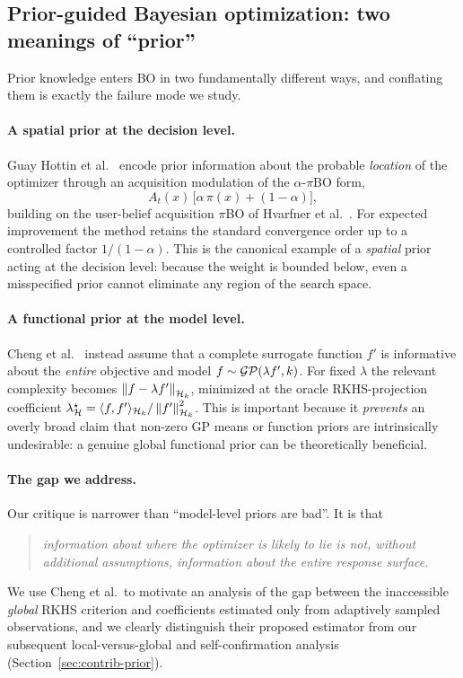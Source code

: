 \subsection{Prior-guided Bayesian optimization: two meanings of ``prior''}
\label{sec:bg-prior}

Prior knowledge enters BO in two fundamentally different ways, and conflating
them is exactly the failure mode we study.

\paragraph{A spatial prior at the decision level.}
Guay Hottin et al.~\cite{guayhottin2025} encode prior information about the
probable \emph{location} of the optimizer through an acquisition modulation of
the $\alpha$-$\pi$BO form,
\[
A_t(x)\,\bigl[\alpha\,\pi(x)+(1-\alpha)\bigr],
\]
building on the user-belief acquisition $\pi$BO of Hvarfner et
al.~\cite{hvarfner2022}. For expected improvement the method retains the standard
convergence order up to a controlled factor $1/(1-\alpha)$. This is the canonical
example of a \emph{spatial} prior acting at the decision level: because the
weight is bounded below, even a misspecified prior cannot eliminate any region of
the search space. \hfill\Plit

\paragraph{A functional prior at the model level.}
Cheng et al.~\cite{cheng2024} instead assume that a complete surrogate function
$f'$ is informative about the \emph{entire} objective and model
$f\sim\mathcal{GP}(\lambda f',k)$. For fixed $\lambda$ the relevant complexity becomes
$\left\lVert f-\lambda f'\right\rVert_{\mathcal{H}_k}$, minimized at the oracle RKHS-projection coefficient
$\lambda^\star_{\mathcal{H}}=\langle f, f'\rangle_{\mathcal{H}_k}/\left\lVert f'\right\rVert^2_{\mathcal{H}_k}$. This is important
because it \emph{prevents} an overly broad claim that non-zero GP means or
function priors are intrinsically undesirable: a genuine global functional prior
can be theoretically beneficial. \hfill\Plit

\paragraph{The gap we address.}
Our critique is narrower than ``model-level priors are bad''. It is that
\begin{quote}
\itshape information about where the optimizer is likely to lie is not, without
additional assumptions, information about the entire response surface.
\end{quote}
We use Cheng et al.\ to motivate an analysis of the gap between the inaccessible
\emph{global} RKHS criterion and coefficients estimated only from adaptively
sampled observations, and we clearly distinguish their proposed estimator from
our subsequent local-versus-global and self-confirmation analysis
(Section~\ref{sec:contrib-prior}). \hfill\Psynth

